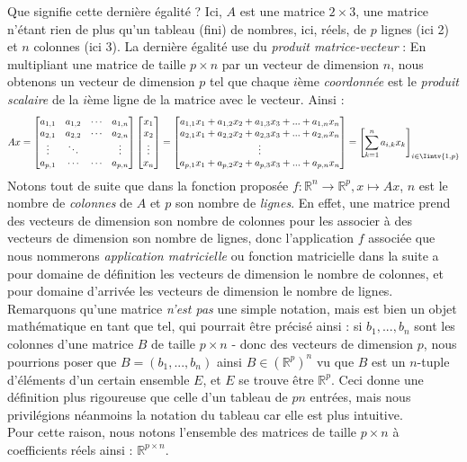 \documentclass{article}
\newcommand{\R}{\mathbb{R}}
\begin{document}
Que signifie cette dernière égalité ? Ici, $A$ est une matrice $2 \times 3$, une matrice n'étant rien de plus qu'un tableau (fini) de nombres, ici, réels, de $p$ lignes (ici 2) et $n$ colonnes (ici 3). La dernière égalité use du \textit{produit matrice-vecteur} : En multipliant une matrice de taille $p \times n$ par un vecteur de dimension $n$, nous obtenons un vecteur de dimension $p$ tel que chaque $i$ème \textit{coordonnée} est le \textit{produit scalaire} de la $i$ème ligne de la matrice avec le vecteur. Ainsi :
$$Ax = \begin{bmatrix} a_{1,1} & a_{1,2} & \cdots & a_{1, n} \\ a_{2,1} & a_{2,2} & \cdots & a_{2, n} \\ \vdots & \ddots & & \vdots \\ a_{p,1} & \cdots & \cdots & a_{p,n} \end{bmatrix}\begin{bmatrix} x_1 \\ x_2 \\ \vdots \\ x_n \end{bmatrix} = \begin{bmatrix} a_{1,1}x_1 + a_{1,2}x_2 + a_{1,3}x_3 + ... + a_{1, n}x_n \\ a_{2,1}x_1 + a_{2,2}x_2 + a_{2,3}x_3 + ... + a_{2, n}x_n \\ \vdots \\ a_{p,1}x_1 + a_{p,2}x_2 + a_{p,3}x_3 + ... + a_{p, n}x_n \end{bmatrix} = \left[\sum_{k = 1}^n a_{i,k}x_k\right]_{i \in \Iintv{1,p}}
$$
Notons tout de suite que dans la fonction proposée $f: \R^n \to \R^p, x \mapsto Ax$, $n$ est le nombre de \textit{colonnes} de $A$ et $p$ son nombre de \textit{lignes}. En effet, une matrice prend des vecteurs de dimension son nombre de colonnes pour les associer à des vecteurs de dimension son nombre de lignes, donc l'application $f$ associée que nous nommerons \textit{application matricielle} ou fonction matricielle dans la suite a pour domaine de définition les vecteurs de dimension le nombre de colonnes, et pour domaine d'arrivée les vecteurs de dimension le nombre de lignes.\\

\noindent Remarquons qu'une matrice \textit{n'est pas} une simple notation, mais est bien un objet mathématique en tant que tel, qui pourrait être précisé ainsi : si $b_1, ..., b_n$ sont les colonnes d'une matrice $B$ de taille $p \times n$ - donc des vecteurs de dimension $p$, nous pourrions poser que $B = (b_1, ..., b_n)$ ainsi $B \in (\R^p)^n$ vu que $B$ est un $n$-tuple d'éléments d'un certain ensemble $E$, et $E$ se trouve être $\R^p$. Ceci donne une définition plus rigoureuse que celle d'un tableau de $pn$ entrées, mais nous privilégions néanmoins la notation du tableau car elle est plus intuitive. \\
Pour cette raison, nous notons l'ensemble des matrices de taille $p \times n$ à coefficients réels ainsi : $\R^{p \times n}$.\\
 
\end{document}
